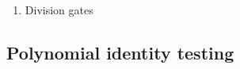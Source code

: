 \begin{enumerate}
\begin{proof}
Claim: Let $\cal G_m$ be multiplication gates with children $t_1,t_2$ with $m<\deg t$ and $\deg(t_1),\deg(t_2)\le m$. Then $\deg (w)\le m<\deg(v)\le 2\deg (w)$ gives 
\[
f_v=\sum_{t\in \cal G_m}f_t\cdot \pl_tf_v,\qquad \pl_wf_v=\sum_{t\in \cal G_m} \pl_wf_t\cdot \pl_tf_v.
\]
Proof: induct.
\end{proof}
Can obtain reduction to depth 4. (2.9)
\item Division gates
\end{enumerate}

\subsection{}

\subsection{Polynomial identity testing}

